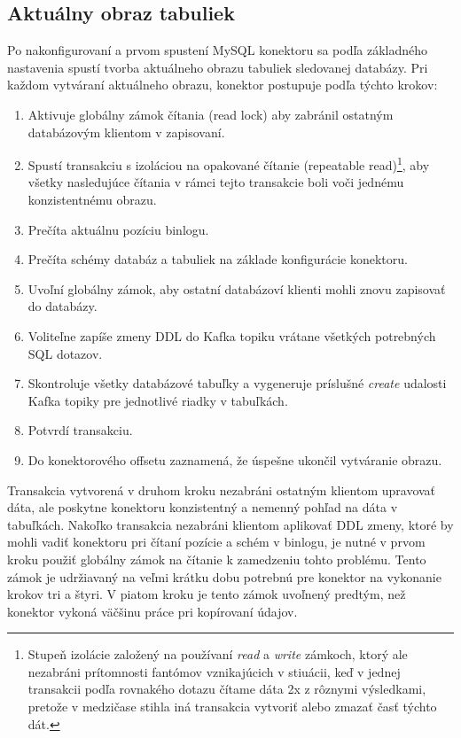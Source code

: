 \subsection{Aktuálny obraz tabuliek} \label{debezium:conistent_snapshot}
Po nakonfigurovaní a prvom spustení MySQL konektoru sa podľa základného nastavenia spustí tvorba aktuálneho obrazu tabuliek sledovanej databázy. Pri každom vytváraní aktuálneho obrazu, konektor postupuje podľa týchto krokov\cite{debezium:consistent_snapshot}:
\begin{enumerate}
\item Aktivuje globálny zámok čítania (read lock) aby zabránil ostatným databázovým klientom v zapisovaní.
\item Spustí transakciu s izoláciou na opakované čítanie (repeatable read)\footnote{Stupeň izolácie založený na používaní \textit{read} a \textit{write} zámkoch, ktorý ale nezabráni prítomnosti fantómov vznikajúcich v stiuácii, keď v jednej transakcii podľa rovnakého dotazu čítame dáta 2x z rôznymi výsledkami, pretože v medzičase stihla iná transakcia vytvoriť alebo zmazať časť týchto dát.}, aby všetky nasledujúce čítania v rámci tejto transakcie boli voči jednému konzistentnému obrazu.
\item Prečíta aktuálnu pozíciu binlogu.
\item Prečíta schémy databáz a tabuliek na základe konfigurácie konektoru.
\item Uvoľní globálny zámok, aby ostatní databázoví klienti mohli znovu zapisovať do databázy.
\item Voliteľne zapíše zmeny DDL do Kafka topiku vrátane všetkých potrebných SQL dotazov.
\item Skontroluje všetky databázové tabuľky a vygeneruje príslušné \textit{create} udalosti  Kafka topiky pre jednotlivé riadky v tabuľkách.
\item Potvrdí transakciu.
\item Do konektorového offsetu zaznamená, že úspešne ukončil vytváranie obrazu.
\end{enumerate}

Transakcia vytvorená v druhom kroku nezabráni ostatným klientom upravovať dáta, ale poskytne konektoru konzistentný a nemenný pohľad na dáta v tabuľkách. Nakoľko transakcia nezabráni klientom aplikovať DDL zmeny, ktoré by mohli vadiť konektoru pri čítaní pozície a schém v binlogu, je nutné v prvom kroku použiť globálny zámok na čítanie k zamedzeniu tohto problému. Tento zámok je udržiavaný na veľmi krátku dobu potrebnú pre konektor na vykonanie krokov tri a štyri. V piatom kroku je tento zámok uvoľnený predtým, než konektor vykoná väčšinu práce pri kopírovaní údajov.

